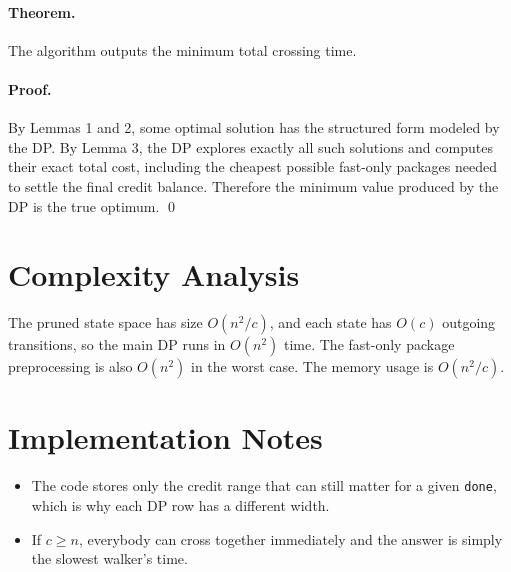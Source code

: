 \documentclass[11pt]{article}
\begin{document}
\paragraph{Theorem.}
The algorithm outputs the minimum total crossing time.

\paragraph{Proof.}
By Lemmas 1 and 2, some optimal solution has the structured form modeled by the DP. By Lemma 3, the
DP explores exactly all such solutions and computes their exact total cost, including the cheapest possible
fast-only packages needed to settle the final credit balance. Therefore the minimum value produced by the
DP is the true optimum. \qed

\section*{Complexity Analysis}

The pruned state space has size $O(n^2/c)$, and each state has $O(c)$ outgoing transitions, so the main
DP runs in $O(n^2)$ time. The fast-only package preprocessing is also $O(n^2)$ in the worst case. The
memory usage is $O(n^2/c)$.

\section*{Implementation Notes}

\begin{itemize}[leftmargin=*]
    \item The code stores only the credit range that can still matter for a given \texttt{done}, which is why
    each DP row has a different width.
    \item If $c \ge n$, everybody can cross together immediately and the answer is simply the slowest
    walker's time.
\end{itemize}
\end{document}
